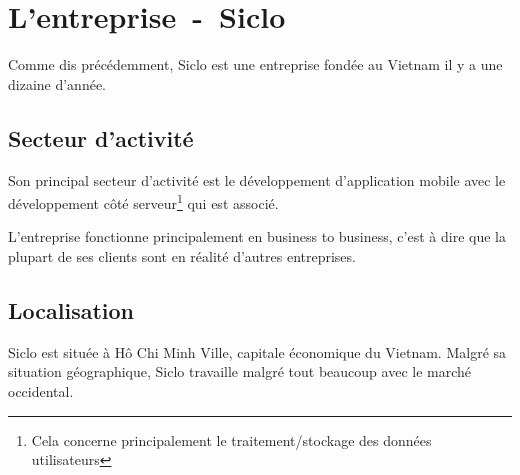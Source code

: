 \documentclass[../rapport.tex]{subfiles}
\begin{document}
    \chapter{L'entreprise~-~Siclo}
        Comme dis précédemment, Siclo est une entreprise fondée au Vietnam il y a une dizaine d'année.
        \section{Secteur d'activité}
        Son principal secteur d'activité est le développement d'application mobile avec le développement côté serveur\footnote{Cela concerne principalement le traitement/stockage des données utilisateurs} qui est associé.

        L'entreprise fonctionne principalement en business to business, c'est à dire que la plupart de ses clients sont en réalité d'autres entreprises.
        \section{Localisation}
        Siclo est située à Hô Chi Minh Ville, capitale économique du Vietnam. Malgré sa situation géographique, Siclo travaille malgré tout beaucoup avec le marché occidental.
\end{document}
